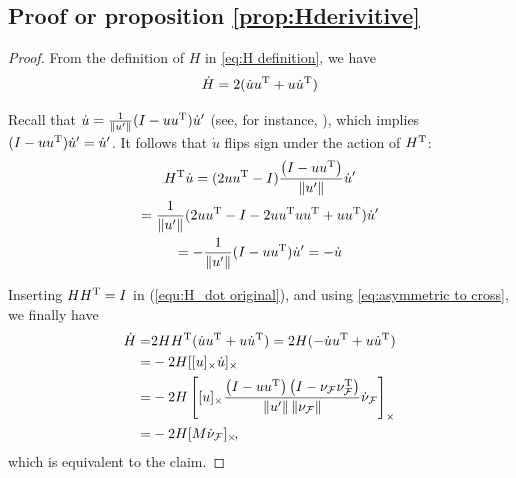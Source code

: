 \documentclass[journal]{IEEEtran}  %
\begin{document}
\subsection{Proof or proposition \ref{prop:Hderivitive}}
\begin{proof}
    From the definition of $H$ in \eqref{eq:H definition}, we have
    \begin{equation} \label{equ:H_dot original}
      \dot H =   2(\dot u u^\mathrm{T} + u \dot u^\mathrm{T})
    \end{equation}

    Recall that $\dot{u}=\frac{1}{\lVert u'\rVert}(I-uu^\mathrm{T})\dot{u}'$ (see, for instance, \cite{Tron:Arxiv14}), which implies $(I-uu^\mathrm{T})\dot{u}'=\dot{u}'$. It follows that $\dot{u}$ flips sign under the action of $H^\mathrm{T}$:
    \begin{multline}
      H^\mathrm{T} \dot u = (2u u^\mathrm{T}-I)\frac{ \left( I - u u^\mathrm{T} \right) } {\left\|u'\right\|} \dot u' \\
      =\frac{1}{\lVert u'\rVert} (2u u^\mathrm{T}-I-2u u^\mathrm{T} u u^\mathrm{T}+u u^\mathrm{T})\dot{u}'\\
      = -\frac{1}{\lVert u'\rVert} (I-u u^\mathrm{T})\dot u'
      = -\dot u
    \end{multline}

    Inserting $HH^\mathrm{T}=I$ in (\ref{equ:H_dot original}), and using \ref{eq:asymmetric to cross}, we finally have
    \begin{equation}
      \begin{split}
        \dot H =  &  2H H^\mathrm{T}(\dot u u^\mathrm{T} + u \dot u^\mathrm{T})
        =  2 H (-\dot u u^\mathrm{T} + u \dot u^\mathrm{T})\\
        =  &  -2H [[u]_{\times} \dot u]_{\times} \\
        = &  -2 H \left[ [u]_{\times}  \frac{ \left( I - u u^\mathrm{T} \right) \left( I- \nu_{\mathcal{F}} \nu_{\mathcal{F}}^\mathrm{T} \right)} {\left\|u'\right\| \left\|\nu_{\mathcal{F}}\right\|} \dot{\nu}_{\mathcal{F}}\right]_{\times}\\
        = & -2 H [M \dot{\nu}_{\mathcal{F}}]_{\times}\!,
      \end{split}
    \end{equation}
    which is equivalent to the claim.
  \end{proof}
  
\end{document}
